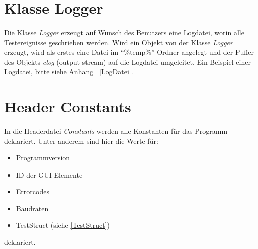 \section{Klasse Logger}\label{LoggerClass}
\paragraph{}
Die Klasse \textit{Logger} erzeugt auf Wunsch des Benutzers eine Logdatei, worin alle Testereignisse geschrieben werden. Wird ein Objekt von der Klasse \textit{Logger} erzeugt, wird als erstes eine Datei im "`\%temp\%"' Ordner angelegt und der Puffer des Objekts \textit{clog} (output stream) auf die Logdatei umgeleitet. Ein Beispiel einer Logdatei, bitte siehe Anhang ~\ref{LogDatei}.\\



\section{Header Constants}
\paragraph{}
In die Headerdatei \textit{Constants} werden alle Konstanten für das Programm deklariert. Unter anderem sind hier die Werte für:

\begin{itemize}
\item Programmversion
\item ID der GUI-Elemente
\item Errorcodes
\item Baudraten
\item TestStruct (siehe \ref{TestStruct})
\end{itemize}

deklariert.